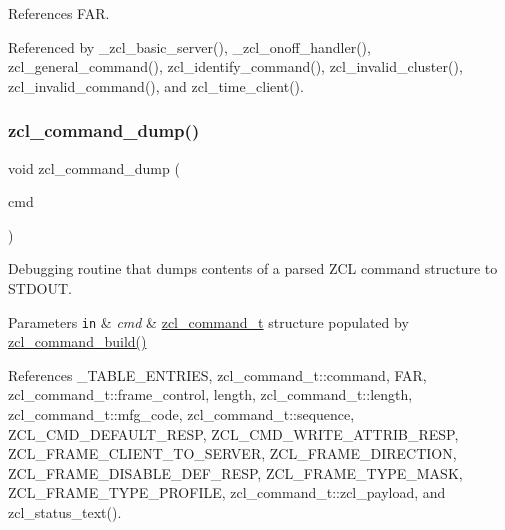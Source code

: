 References F\+AR.



Referenced by \+\_\+zcl\+\_\+basic\+\_\+server(), \+\_\+zcl\+\_\+onoff\+\_\+handler(), zcl\+\_\+general\+\_\+command(), zcl\+\_\+identify\+\_\+command(), zcl\+\_\+invalid\+\_\+cluster(), zcl\+\_\+invalid\+\_\+command(), and zcl\+\_\+time\+\_\+client().

\mbox{\label{group__zcl_gaca5c04dd787b041bf40f3b2a4463bb70}} 
\subsubsection{\texorpdfstring{zcl\+\_\+command\+\_\+dump()}{zcl\_command\_dump()}}
{\footnotesize\ttfamily void zcl\+\_\+command\+\_\+dump (\begin{DoxyParamCaption}\item[{const \hyperlink{structzcl__command__t}{zcl\+\_\+command\+\_\+t} $\ast$}]{cmd }\end{DoxyParamCaption})}



Debugging routine that dumps contents of a parsed Z\+CL command structure to S\+T\+D\+O\+UT. 


\begin{DoxyParams}[1]{Parameters}
\mbox{\tt in}  & {\em cmd} & \hyperlink{structzcl__command__t}{zcl\+\_\+command\+\_\+t} structure populated by \hyperlink{group__zcl_gadeb35ab493fffec9ba1c33f658929136}{zcl\+\_\+command\+\_\+build()} \\
\hline
\end{DoxyParams}


References \+\_\+\+T\+A\+B\+L\+E\+\_\+\+E\+N\+T\+R\+I\+ES, zcl\+\_\+command\+\_\+t\+::command, F\+AR, zcl\+\_\+command\+\_\+t\+::frame\+\_\+control, length, zcl\+\_\+command\+\_\+t\+::length, zcl\+\_\+command\+\_\+t\+::mfg\+\_\+code, zcl\+\_\+command\+\_\+t\+::sequence, Z\+C\+L\+\_\+\+C\+M\+D\+\_\+\+D\+E\+F\+A\+U\+L\+T\+\_\+\+R\+E\+SP, Z\+C\+L\+\_\+\+C\+M\+D\+\_\+\+W\+R\+I\+T\+E\+\_\+\+A\+T\+T\+R\+I\+B\+\_\+\+R\+E\+SP, Z\+C\+L\+\_\+\+F\+R\+A\+M\+E\+\_\+\+C\+L\+I\+E\+N\+T\+\_\+\+T\+O\+\_\+\+S\+E\+R\+V\+ER, Z\+C\+L\+\_\+\+F\+R\+A\+M\+E\+\_\+\+D\+I\+R\+E\+C\+T\+I\+ON, Z\+C\+L\+\_\+\+F\+R\+A\+M\+E\+\_\+\+D\+I\+S\+A\+B\+L\+E\+\_\+\+D\+E\+F\+\_\+\+R\+E\+SP, Z\+C\+L\+\_\+\+F\+R\+A\+M\+E\+\_\+\+T\+Y\+P\+E\+\_\+\+M\+A\+SK, Z\+C\+L\+\_\+\+F\+R\+A\+M\+E\+\_\+\+T\+Y\+P\+E\+\_\+\+P\+R\+O\+F\+I\+LE, zcl\+\_\+command\+\_\+t\+::zcl\+\_\+payload, and zcl\+\_\+status\+\_\+text().

